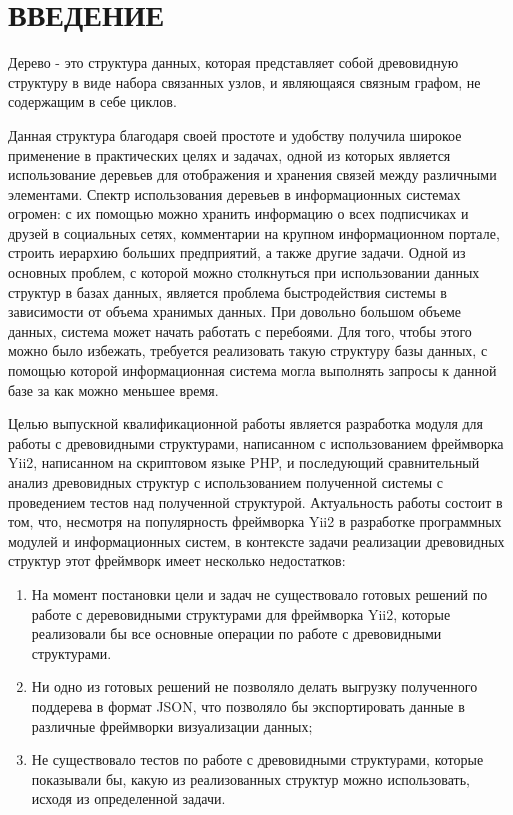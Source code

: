 \documentclass[a4paper,14pt]{extreport}
\theoremstyle{definition}
\begin{document}
\chapter*{ВВЕДЕНИЕ}
Дерево - это структура данных, которая представляет собой древовидную структуру в виде набора связанных узлов, и являющаяся связным графом, не содержащим в себе циклов\cite{Varga}.

Данная структура благодаря своей простоте и удобству получила широкое применение в практических целях и задачах\cite{Cormen}, одной из которых является использование деревьев для отображения и хранения связей между различными элементами. Спектр использования деревьев в информационных системах огромен: с их помощью можно хранить информацию о всех подписчиках и друзей в социальных сетях, комментарии на крупном информационном портале, строить иерархию больших предприятий, а также другие задачи. Одной из основных проблем, с которой можно столкнуться при использовании данных структур в базах данных, является проблема быстродействия системы в зависимости от объема хранимых данных. При довольно большом объеме данных, система может начать работать с перебоями. Для того, чтобы этого можно было избежать, требуется реализовать такую структуру базы данных, с помощью которой информационная система могла выполнять запросы к данной базе за как можно меньшее время.

Целью выпускной квалификационной работы является разработка модуля для работы с древовидными структурами, написанном с использованием фреймворка Yii2, написанном на скриптовом языке PHP, и последующий сравнительный анализ древовидных структур с использованием полученной системы с проведением тестов над полученной структурой. Актуальность работы состоит в том, что, несмотря на популярность фреймворка Yii2 в разработке программных модулей и информационных систем, в контексте задачи реализации древовидных структур этот фреймворк имеет несколько недостатков:
\begin{enumerate}
\item На момент постановки цели и задач не существовало готовых решений по работе с деревовидными структурами для фреймворка Yii2, которые реализовали бы все основные операции по работе с древовидными структурами.
\item Ни одно из готовых решений не позволяло делать выгрузку полученного поддерева в формат JSON, что позволяло бы экспортировать данные в различные фреймворки визуализации данных;
\item Не существовало тестов по работе с древовидными структурами, которые показывали бы, какую из реализованных структур можно использовать, исходя из определенной задачи.
\end{enumerate}
\end{document}
